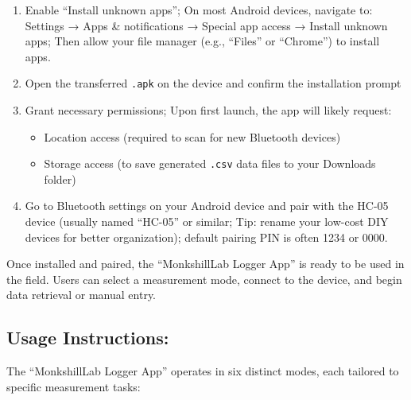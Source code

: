 \documentclass[
  11pt,
  letterpaper,
]{book}
\providecommand{\tightlist}{%
  \setlength{\itemsep}{0pt}\setlength{\parskip}{0pt}}
\begin{document}
\begin{enumerate}
\def\labelenumi{\arabic{enumi}.}
\tightlist
\item
  Enable ``Install unknown apps''; On most Android devices, navigate to:
  Settings → Apps \& notifications → Special app access → Install
  unknown apps; Then allow your file manager (e.g., ``Files'' or
  ``Chrome'') to install apps.
\item
  Open the transferred \texttt{.apk} on the device and confirm the
  installation prompt
\item
  Grant necessary permissions; Upon first launch, the app will likely
  request:

  \begin{itemize}
  \tightlist
  \item
    Location access (required to scan for new Bluetooth devices)
  \item
    Storage access (to save generated \texttt{.csv} data files to your
    Downloads folder)
  \end{itemize}
\item
  Go to Bluetooth settings on your Android device and pair with the
  HC-05 device (usually named ``HC-05'' or similar; Tip: rename your
  low-cost DIY devices for better organization); default pairing PIN is
  often 1234 or 0000.
\end{enumerate}

Once installed and paired, the ``MonkshillLab Logger App'' is ready to
be used in the field. Users can select a measurement mode, connect to
the device, and begin data retrieval or manual entry.

\subsection{Usage Instructions:}\label{sec-monkshilllab-app-usage}

The ``MonkshillLab Logger App'' operates in six distinct modes, each
tailored to specific measurement tasks:
\end{document}
